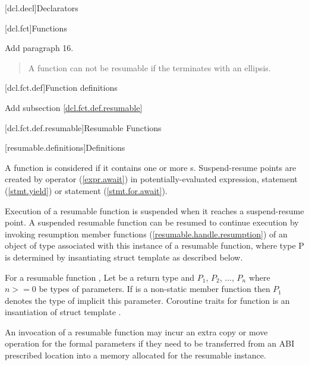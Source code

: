 
[dcl.decl]{Declarators}

\setcounter{section}{3}
\setcounter{subsection}{4}
[dcl.fct]{Functions}%

Add paragraph 16.

\begin{quote}
\setcounter{Paras}{15}
\pnum
A function can not be resumable if the  terminates with an ellipsis.
\end{quote}

\setcounter{section}{3}
[dcl.fct.def]{Function definitions}

Add subsection \ref{dcl.fct.def.resumable}

\setcounter{subsection}{3}
[dcl.fct.def.resumable]{Resumable Functions}

[resumable.definitions]{Definitions}

\pnum
A function is considered  if it contains
one or more s. 
Suspend-resume points are created by  operator (\ref{expr.await}) in potentially-evaluated expression,
 statement (\ref{stmt.yield}) 
or  statement (\ref{stmt.for.await}).


\pnum
Execution of a resumable function is suspended when it reaches a suspend-resume point.
A suspended resumable function can be resumed
to continue execution by invoking
resumption member functions (\ref{resumable.handle.resumption}) of an object of  type
associated with this instance of a resumable function, where type P
is determined by insantiating struct template  as described below. 

\pnum

\pnum
For a resumable function , Let  be a return type and $P_1$, $P_2$, ..., $P_n$
where $n >= 0$ be types of parameters. If  is a non-static member function then $P_1$ denotes the type of implicit this parameter. 
Coroutine traits for function  is an insantiation of
struct template .

\pnum
An invocation of a resumable function may incur an extra copy or move operation for the formal parameters if they need to be transferred from an ABI prescribed location into a memory allocated for the resumable instance. 

